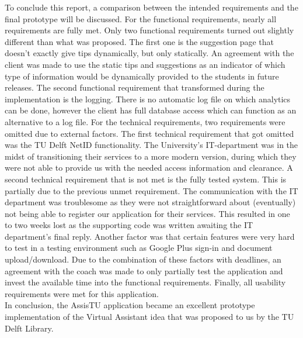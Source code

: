 To conclude this report, a comparison between the intended requirements and the final prototype will be discussed. For the functional requirements, nearly all requirements are fully met. Only two functional requirements turned out slightly different than what was proposed. The first one is the suggestion page that doesn't exactly give tips dynamically, but only statically. An agreement with the client was made to use the static tips and suggestions as an indicator of which type of information would be dynamically provided to the students in future releases. The second functional requirement that transformed during the implementation is the logging. There is no automatic log file on which analytics can be done, however the client has full database access which can function as an alternative to a log file.
For the technical requirements, two requirements were omitted due to external factors. The first technical requirement that got omitted was the TU Delft NetID functionality. The University's IT-department was in the midst of transitioning their services to a more modern version, during which they were not able to provide us with the needed access information and clearance. A second technical requirement that is not met is the fully tested system. This is partially due to the previous unmet requirement. The communication with the IT department was troublesome as they were not straightforward about (eventually) not being able to register our application for their services. This resulted in one to two weeks lost as the supporting code was written awaiting the IT department's final reply. Another factor was that certain features were very hard to test in a testing environment such as Google Plus sign-in and document upload/download. Due to the combination of these factors with deadlines, an agreement with the coach was made to only partially test the application and invest the available time into the functional requirements.
Finally, all usability requirements were met for this application. \\

In conclusion, the AssisTU application became an excellent prototype implementation of the Virtual Assistant idea that was proposed to us by the TU Delft Library.